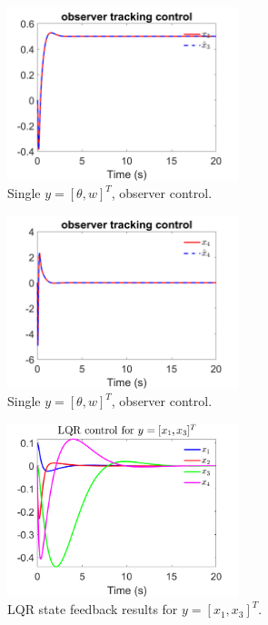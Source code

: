 \documentclass[12pt]{article}
\numberwithin{equation}{section}
\begin{document}
\begin{figure}[!ht]
    \centering
    \includegraphics[width=0.6\textwidth]{double_output_observer/fig11.png}
    \caption{Single $y = [\theta,w]^T$, observer control.}
\end{figure}

\begin{figure}[!ht]
    \centering
    \includegraphics[width=0.6\textwidth]{double_output_observer/fig12.png}
    \caption{Single $y = [\theta,w]^T$, observer control.}
    \label{fig:observer_sim_last}
\end{figure}

\begin{figure}
    \centering
    \includegraphics[width=0.6\textwidth]{lqr/lqr_1.png}
    \caption{LQR state feedback results for $y = [x_1, x_3]^T$.}
    \label{fig:lqr1}
\end{figure}
\end{document}
